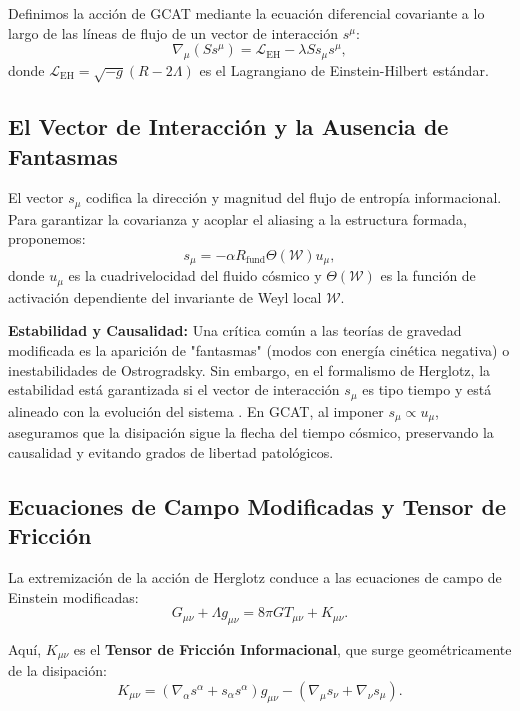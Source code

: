 \documentclass[12pt, a4paper]{article}
\theoremstyle{plain}
\theoremstyle{definition}
\begin{document}
Definimos la acción de GCAT mediante la ecuación diferencial covariante a lo largo de las líneas de flujo de un vector de interacción $s^\mu$:
\begin{equation}
\nabla_\mu (S s^\mu) = \mathcal{L}_{\text{EH}} - \lambda S s_\mu s^\mu,
\end{equation}
donde $\mathcal{L}_{\text{EH}} = \sqrt{-g}(R - 2\Lambda)$ es el Lagrangiano de Einstein-Hilbert estándar.

\subsection{El Vector de Interacción y la Ausencia de Fantasmas}

El vector $s_\mu$ codifica la dirección y magnitud del flujo de entropía informacional. Para garantizar la covarianza y acoplar el aliasing a la estructura formada, proponemos:
\begin{equation}
s_\mu = -\alpha R_{\text{fund}} \Theta(\mathcal{W}) u_\mu,
\end{equation}
donde $u_\mu$ es la cuadrivelocidad del fluido cósmico y $\Theta(\mathcal{W})$ es la función de activación dependiente del invariante de Weyl local $\mathcal{W}$.

\textbf{Estabilidad y Causalidad:} Una crítica común a las teorías de gravedad modificada es la aparición de "fantasmas" (modos con energía cinética negativa) o inestabilidades de Ostrogradsky. Sin embargo, en el formalismo de Herglotz, la estabilidad está garantizada si el vector de interacción $s_\mu$ es tipo tiempo y está alineado con la evolución del sistema \cite{Lazo2017}. En GCAT, al imponer $s_\mu \propto u_\mu$, aseguramos que la disipación sigue la flecha del tiempo cósmico, preservando la causalidad y evitando grados de libertad patológicos.

\subsection{Ecuaciones de Campo Modificadas y Tensor de Fricción}

La extremización de la acción de Herglotz conduce a las ecuaciones de campo de Einstein modificadas:
\begin{equation}
G_{\mu\nu} + \Lambda g_{\mu\nu} = 8\pi G T_{\mu\nu} + K_{\mu\nu}.
\label{eq:field_equations}
\end{equation}

Aquí, $K_{\mu\nu}$ es el \textbf{Tensor de Fricción Informacional}, que surge geométricamente de la disipación:
\begin{equation}
K_{\mu\nu} = \left(\nabla_\alpha s^\alpha + s_\alpha s^\alpha \right) g_{\mu\nu} - \left(\nabla_\mu s_\nu + \nabla_\nu s_\mu \right).
\end{equation}
\end{document}
